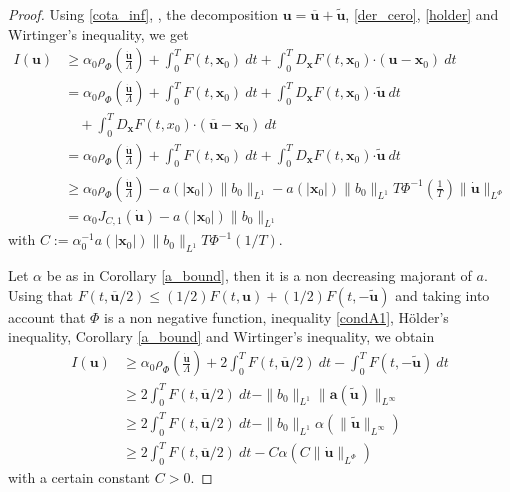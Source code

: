 \documentclass[twoside]{article}
\theoremstyle{remark}
\newcommand{\orlnor}{\|_{L^{\Phi}}}
\newcommand{\lphi}{L^{\Phi}}
\renewcommand{\b}[1]{\boldsymbol{#1}}
\newcommand{\ccdot}{\b{\cdot}}
\renewcommand{\leq}{\leqslant}
\begin{document}
\begin{proof}  Using \eqref{cota_inf}, \cite[Eq. (18), p.17]{mawhin2010critical},  the decomposition $\b{u}=\b{\overline{u}}+\b{\tilde{u}}$,  \eqref{der_cero}, \eqref{holder} and Wirtinger's inequality, we get
%
\begin{equation}\label{cota_con _upunto}
\begin{split}
I(\b{u})&\geq\alpha_0\rho_{\Phi}\left( \frac{\b{\dot{u}}}{\Lambda}\right)+\int_0^T F(t,\b{x}_0)\ dt 
+ \int_0^T D_{\b{x}} F (t,\b{x}_0) \ccdot (\b{u}-\b{x}_0)\ dt\\
&=\alpha_0\rho_{\Phi}\left( \frac{\b{\dot{u}}}{\Lambda}\right) +\int_0^T F(t,\b{x}_0)\ dt 
+ \int_0^TD_{\b{x}}F (t,\b{x}_0) \ccdot \b{\widetilde{u}} \ dt\\
&\quad + \int_0^T D_{\b{x}} F (t,x_0) \ccdot (\b{\overline{u}}  -\b{x}_0) \ dt\\
&=\alpha_0\rho_{\Phi}\left( \frac{\b{\dot{u}}}{\Lambda}\right)+\int_0^T F(t,\b{x}_0)\ dt + 
\int_0^T D_{\b{x}} F (t,\b{x}_0) \ccdot \b{\widetilde{u}}\ dt\\
&\geq\alpha_0 \rho_{\Phi}\left( \frac{\b{\dot{u}}}{\Lambda}\right)-a(|\b{x}_0|)\|b_0\|_{L^1} 
-a(|\b{x}_0|)\|b_0\|_{L^1}T\Phi^{-1}\left(\frac{1}{T}\right) \|\b{\dot{u}}  \|_{\lphi}\\
&= \alpha_0 J_{C,1}(\b{\dot{u}})-a(|\b{x}_0|)\|b_0\|_{L^1} 
\end{split}
\end{equation}
with $C:=\alpha_0^{-1}a(|\b{x}_0|)\|b_0\|_{L^1}T\Phi^{-1}(1/T)$. 

Let $\alpha$ be as in Corollary \ref{a_bound}, then it is  a non decreasing majorant of $a$. Using that  $F(t, \b{\overline{u}} /2) \leq (1/2)F(t,\b{u}) + (1/2) F(t, -\b{\widetilde{u}})$ and taking into account that $\Phi$ is a non negative function, inequality \eqref{condA1}, H\"older's inequality,  Corollary \ref{a_bound} and Wirtinger's inequality, we obtain
\begin{equation}\label{cota_con _ubarra}
\begin{split}
I(\b{u}) &\geq\alpha_0\rho_{\Phi}\left( \frac{\b{\dot{u}}}{\Lambda}\right)  +2 \int_0^T F(t,\b{\overline{u}} /2)\ dt - \int_0^T F(t, -\b{\widetilde{u}})\ dt\\
&\geq 2 \int_0^T F(t,\b{\overline{u}} /2)\ dt -\|b_0\|_{L^1} \|\b{a}(\b{\tilde{u}})\|_{L^{\infty}}\\
&\geq 2 \int_0^T F(t,\b{\overline{u}} /2)\ dt -\|b_0\|_{L^1} \alpha(\|\b{\tilde{u}}\|_{L^{\infty}})\\
&\geq 2 \int_0^T F(t,\b{\overline{u}} /2)\  dt - C \alpha(C\|\b{\dot{u}}\orlnor)
\end{split}
\end{equation}
with a certain constant $C>0$.


\end{proof}
\end{document}
